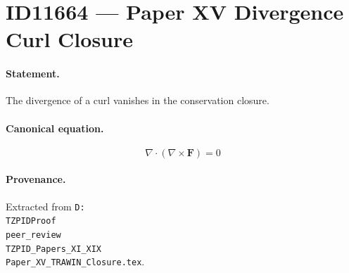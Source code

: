 \section*{ID11664 --- Paper XV Divergence Curl Closure}

\paragraph{Statement.}
The divergence of a curl vanishes in the conservation closure.

\paragraph{Canonical equation.}
\[
\nabla\cdot(\nabla\times\mathbf{F})=0
\]

\paragraph{Provenance.}
Extracted from \texttt{D:\\TZPIDProof\\peer\_review\\TZPID\_Papers\_XI\_XIX\\Paper\_XV\_TRAWIN\_Closure.tex}.
